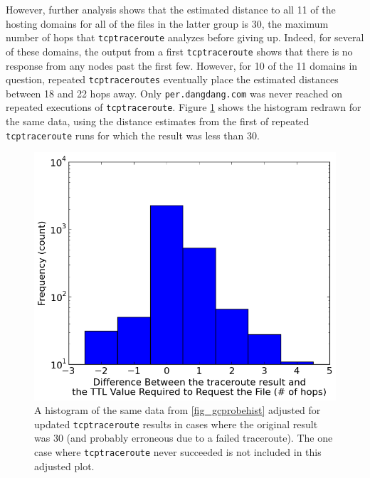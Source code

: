 However, further analysis shows that the estimated distance to all 11 of the hosting domains for all of the files in the latter group is 30, the maximum number of hops that \texttt{tcptraceroute} analyzes before giving up.
Indeed, for several of these domains, the output from a first \texttt{tcptraceroute} shows that there is no response from any nodes past the first few.
However, for 10 of the 11 domains in question, repeated \texttt{tcptraceroutes} eventually place the estimated distances between 18 and 22 hops away.
Only \texttt{per.dangdang.com} was never reached on repeated executions of \texttt{tcptraceroute}.
Figure \ref{fig_modifiedhist} shows the histogram redrawn for the same data, using the distance estimates from the first of repeated \texttt{tcptraceroute} runs for which the result was less than 30.
\begin{figure}
	\includegraphics[width=\columnwidth]{figures/modifiedhist}
	\caption{
		A histogram of the same data from \ref{fig_gcprobehist} adjusted for updated \texttt{tcptraceroute} results in cases where the original result was 30 (and probably erroneous due to a failed traceroute).
		The one case where \texttt{tcptraceroute} never succeeded is not included in this adjusted plot.
	}
	\label{fig_modifiedhist}
\end{figure}